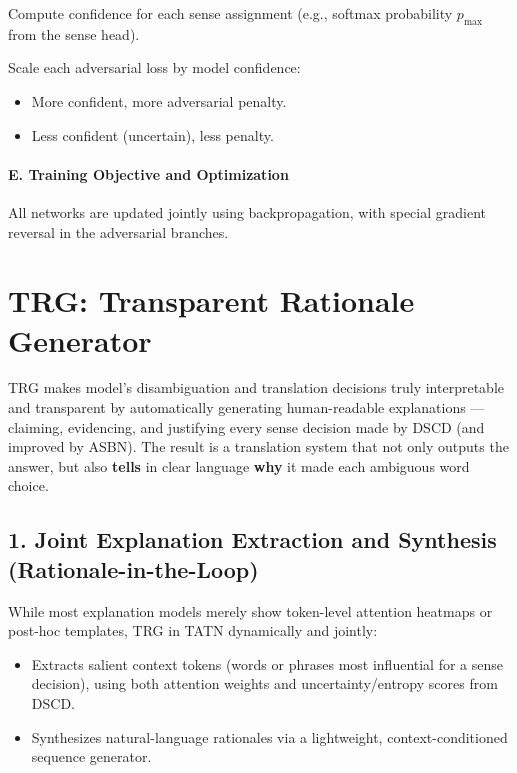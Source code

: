 \documentclass[a4paper,12pt]{article}
\begin{document}
Compute confidence for each sense assignment (e.g., softmax probability $p_{\max}$ from the sense head).

Scale each adversarial loss by model confidence:

\begin{itemize}
    \item More confident, more adversarial penalty.
    \item Less confident (uncertain), less penalty.
\end{itemize}

\paragraph{E. Training Objective and Optimization}

All networks are updated jointly using backpropagation, with special gradient reversal in the adversarial branches.

\bigskip

\section*{TRG: Transparent Rationale Generator}

TRG makes model’s disambiguation and translation decisions truly interpretable and transparent by automatically generating human-readable explanations — claiming, evidencing, and justifying every sense decision made by DSCD (and improved by ASBN). The result is a translation system that not only outputs the answer, but also \textbf{tells} in clear language \textbf{why} it made each ambiguous word choice.

\subsection*{1. Joint Explanation Extraction and Synthesis (Rationale-in-the-Loop)}

While most explanation models merely show token-level attention heatmaps or post-hoc templates, TRG in TATN dynamically and jointly:

\begin{itemize}
    \item Extracts salient context tokens (words or phrases most influential for a sense decision), using both attention weights and uncertainty/entropy scores from DSCD.
    \item Synthesizes natural-language rationales via a lightweight, context-conditioned sequence generator.
\end{itemize}
\end{document}
